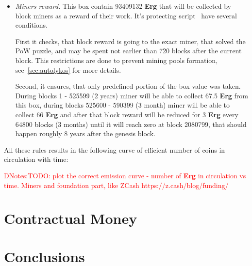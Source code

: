 \documentclass[]{article}
\newcommand{\dnote}[1]{{\textcolor{red}{DNotes:{#1}}}}
\newcommand{\Erg}{\textbf{Erg}}
\begin{document}
\begin{itemize}
        \item{\em Miners reward.} This box contain 93409132 \Erg{} that will be collected by block miners
        as a reward of their work.
        It's protecting script~\cite{link to corresponding ergo tree} have several conditions.

        First it checks, that block reward is going to the exact miner, that solved the PoW puzzle, and
        may be spent not earlier than 720 blocks after the current block.
        This restrictions are done to prevent mining pools formation, see~\ref{sec:autolykos} for more details.

        Second, it ensures, that only predefined portion of the box value was taken.
        During blocks 1 - 525599 (2 years) miner will be able to collect 67.5 \Erg{} from this box,
        during blocks 525600 - 590399 (3 month) miner will be able to collect 66 \Erg{} and after
        that block reward will be reduced for 3 \Erg{} every 64800 blocks (3 months) until it will reach zero
        at block 2080799, that should happen roughly 8 years after the genesis block.


    \end{itemize}

    All these rules results in the following curve of efficient number of coins in circulation with time:

    \dnote{TODO: plot the correct emission curve - number of \Erg{} in circulation vs time. Miners and foundation part, like ZCash https://z.cash/blog/funding/}


    \section{Contractual Money}
    \label{sec:contractual}



    \section{Conclusions}

    
\end{document}
